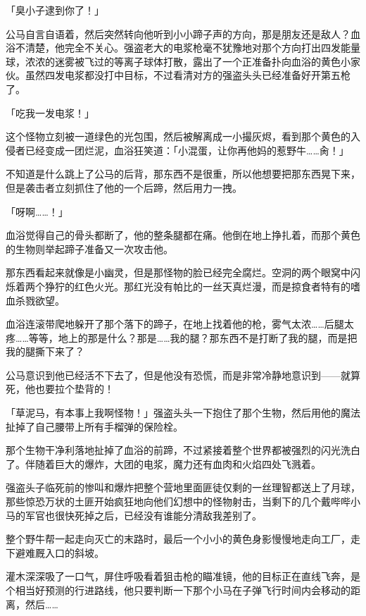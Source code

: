 「臭小子逮到你了！」

公马自言自语着，然后突然转向他听到小小蹄子声的方向，那是朋友还是敌人？血浴不清楚，他完全不关心。强盗老大的电浆枪毫不犹豫地对那个方向打出四发能量球，浓浓的迷雾被飞过的等离子球体打散，露出了一个正准备扑向血浴的黄色小家伙。虽然四发电浆都没打中目标，不过看清对方的强盗头头已经准备好开第五枪了。

「吃我一发电浆！」

这个怪物立刻被一道绿色的光包围，然后被解离成一小撮灰烬，看到那个黄色的入侵者已经变成一团烂泥，血浴狂笑道：「小混蛋，让你再他妈的惹野牛……肏！」

不知道是什么跳上了公马的后背，那东西不是很重，所以他想要把那东西晃下来，但是袭击者立刻抓住了他的一个后蹄，然后用力一拽。

「呀啊……！」

血浴觉得自己的骨头都断了，他的整条腿都在痛。他倒在地上挣扎着，而那个黄色的生物则举起蹄子准备又一次攻击他。

那东西看起来就像是小幽灵，但是那怪物的脸已经完全腐烂。空洞的两个眼窝中闪烁着两个狰狞的红色火光。那红光没有帕比的一丝天真烂漫，而是掠食者特有的嗜血杀戮欲望。

血浴连滚带爬地躲开了那个落下的蹄子，在地上找着他的枪，雾气太浓……后腿太疼……等等，地上的那是什么？那是……我的腿？那东西不是打断了我的腿，而是把我的腿撕下来了？

公马意识到他已经活不下去了，但是他没有恐慌，而是非常冷静地意识到——就算死，他也要拉个垫背的！

「草泥马，有本事上我啊怪物！」强盗头头一下抱住了那个生物，然后用他的魔法扯掉了自己腰带上所有手榴弹的保险栓。

那个生物干净利落地扯掉了血浴的前蹄，不过紧接着整个世界都被强烈的闪光洗白了。伴随着巨大的爆炸，大团的电浆，魔力还有血肉和火焰四处飞溅着。

强盗头子临死前的惨叫和爆炸把整个营地里面匪徒仅剩的一丝理智都送上了月球，那些惊恐万状的土匪开始疯狂地向他们幻想中的怪物射击，当剩下的几个戴哔哔小马的军官也很快死掉之后，已经没有谁能分清敌我差别了。

整个野牛帮一起走向灭亡的末路时，最后一个小小的黄色身影慢慢地走向工厂，走下避难厩入口的斜坡。

\horizonline


灌木深深吸了一口气，屏住呼吸看着狙击枪的瞄准镜，他的目标正在直线飞奔，是个相当好预测的行进路线，他只要判断一下那个小马在子弹飞行时间内会移动的距离，然后……{}

